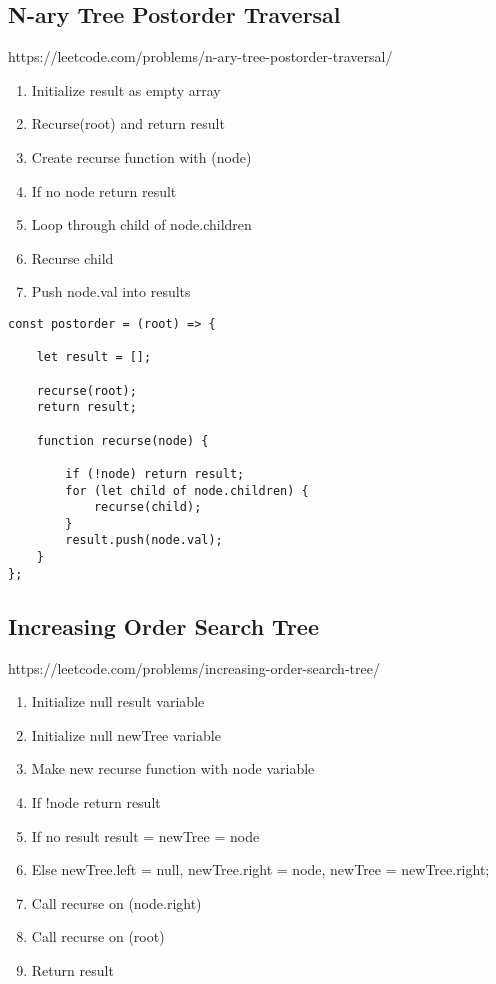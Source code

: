\documentclass[10pt]{article}
\begin{document}
\medskip %










\pagebreak
\medskip   
\subsection{N-ary Tree Postorder Traversal}
https://leetcode.com/problems/n-ary-tree-postorder-traversal/

\begin{enumerate}
	\item Initialize result as empty array
	\item Recurse(root) and return result
	\item Create recurse function with (node)
	\item If no node return result
	\item Loop through child of node.children 
	\item Recurse child
	\item Push node.val into results
\end{enumerate}

\begin{lstlisting}[title=Solution postorder, captionpos=t]
const postorder = (root) => {

    let result = [];

    recurse(root);
    return result;

    function recurse(node) {
        
        if (!node) return result;
        for (let child of node.children) {
            recurse(child);
        }
        result.push(node.val);
    }
};
\end{lstlisting}

\medskip %









\pagebreak
\medskip   
\subsection {Increasing Order Search Tree}
https://leetcode.com/problems/increasing-order-search-tree/

\begin{enumerate}
	\item Initialize null result variable
	\item Initialize null newTree variable
	\item Make new recurse function with node variable
	\item If !node return result 
	\item If no result result = newTree = node
	\item Else newTree.left = null, newTree.right = node, newTree = newTree.right;
	\item Call recurse on (node.right)
	\item Call recurse on (root)
	\item Return result 
\end{enumerate}
\end{document}
